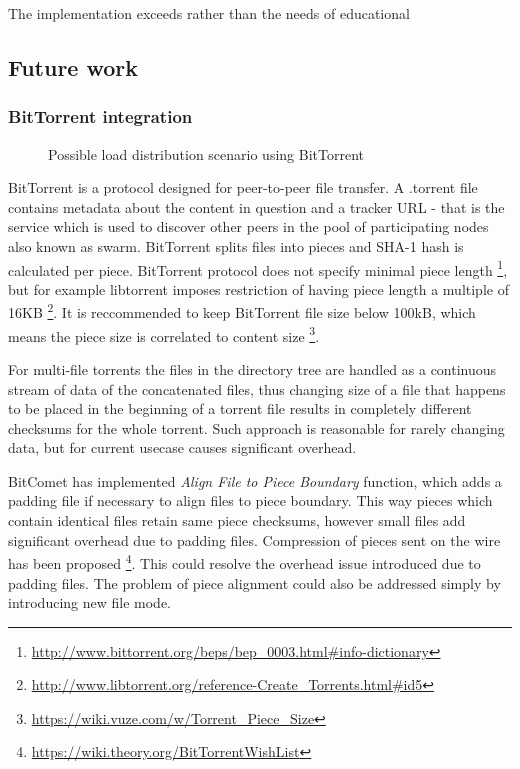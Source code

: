 \documentclass{article}
\begin{document}
The implementation exceeds rather than  the needs of educational 



\subsection{Future work}

\subsubsection{BitTorrent integration}


\begin{figure}[!htb]
\centering
\scalebox{0.5}{}
\caption{Possible load distribution scenario using BitTorrent}
\label{fig:butterknife-usecase-bittorrent}
\end{figure}

BitTorrent is a protocol designed for peer-to-peer file transfer.
A .torrent file contains metadata about the content in question and a
tracker URL - that is the service which is used to discover other peers in the
pool of participating nodes also known as swarm.
BitTorrent splits files into pieces and SHA-1 hash is calculated per piece.
BitTorrent protocol does not specify minimal piece length
\footnote{\url{http://www.bittorrent.org/beps/bep_0003.html#info-dictionary}},
but for example libtorrent imposes restriction of having piece length
a multiple of 16KB
\footnote{\url{http://www.libtorrent.org/reference-Create_Torrents.html#id5}}.
It is reccommended to keep BitTorrent file size below 100kB,
which means the piece size is correlated to content size
\footnote{\url{https://wiki.vuze.com/w/Torrent_Piece_Size}}.

For multi-file torrents the files in the directory tree are handled
as a continuous stream of data of the concatenated files,
thus changing size of a file that happens to be placed in the beginning of a torrent
file results in completely different checksums for the whole torrent.
Such approach is reasonable for rarely changing data, but for current usecase
causes significant overhead.

BitComet has implemented \emph{Align File to Piece Boundary} function,
which adds a padding file if necessary to align files to piece boundary.
This way pieces which contain identical files retain same piece checksums,
however small files add significant overhead due to padding files.
Compression of pieces sent on the wire has been proposed
\footnote{\url{https://wiki.theory.org/BitTorrentWishList}}.
This could resolve the overhead issue introduced due to padding files.
The problem of piece alignment could also be addressed
simply by introducing new file mode.
\end{document}
